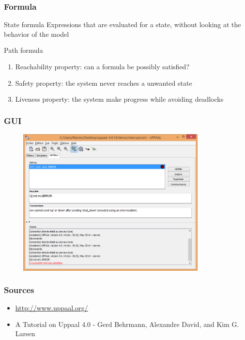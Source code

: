 \documentclass{beamer}
\begin{document}
\begin{frame}
	\frametitle{Formula}
	\begin{block}{State formula}
		Expressions that are evaluated for a state, without looking at the behavior of the model
	\end{block}
	
	\begin{block}{Path formula}
		\begin{enumerate}
			\item Reachability property: can a formula be possibly satisfied?
			\item Safety property: the system never reaches a unwanted state
			\item Liveness property: the system make progress while avoiding deadlocks
		\end{enumerate}
	\end{block}
	
\end{frame}

\begin{frame}
	\frametitle{GUI}
	\begin{figure}
    	\centering
    	\includegraphics[width = 0.85\textwidth]{uppaal_verifier.png}
  	\end{figure}
\end{frame}

\begin{frame}[plain]
	\frametitle{Sources}
	\begin{block}{}
		\begin{itemize}
			\item \url{http://www.uppaal.org/}
			\item A Tutorial on Uppaal 4.0 - Gerd Behrmann, Alexandre David, and Kim G. Larsen
		\end{itemize}
	\end{block}
\end{frame}
\end{document}

